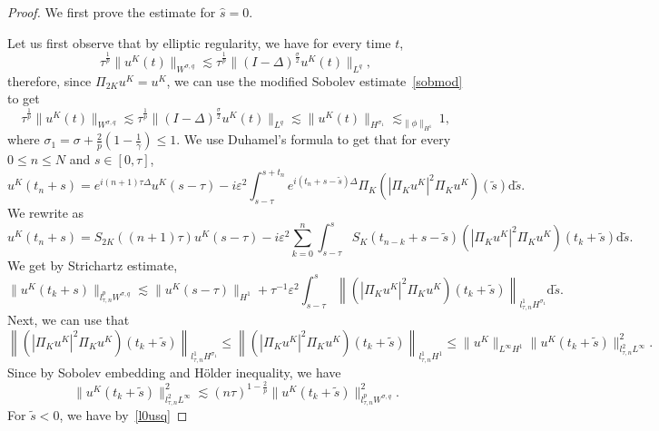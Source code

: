\documentclass[10pt,a4paper]{article}
\begin{document}
  \begin{proof}
    We first prove the estimate for \(\hat{s}=0\).

    Let us first observe that by elliptic regularity, we have for every time
    \(t\),
    \[ \tau^{\frac{1}{p}} \|u^K(t)\|_{W^{\sigma,q}} \lesssim \tau^{\frac{1}{p}}
    \|(I-\Delta)^{\frac{\sigma}{2}} u^K(t)\|_{L^q}, \]
    therefore, since \(\Pi_{2K}u^K=u^K\), we can use the modified Sobolev
    estimate~\eqref{sobmod} to get 
    \begin{equation}\label{l0usq}%
      \tau^{\frac{1}{p}} \|u^K(t)\|_{W^{\sigma, q}} \lesssim 
      \tau^{\frac{1}{p}} \|(I-\Delta)^{\frac{\sigma}{2}} u^K(t)\|_{L^q} 
      \lesssim \|u^K(t)\|_{H^{\sigma_1}} 
      \lesssim_{\|\phi\|_{H^1}} 1,
    \end{equation}
    where \(\sigma_1 = \sigma + \frac2p(1-\frac1\gamma) \leq 1\).
    We use Duhamel's formula to get that for every \( 0 \leq n \leq N \) and 
    \( s \in [0,\tau] \),
    \[ u^K(t_n+s) = e^{i(n+1)\tau\Delta} u^K(s-\tau) - i\varepsilon^2 
    \int_{s-\tau}^{s+t_n} e^{i(t_n+s-\tilde{s})\Delta}\Pi_K
    \left(|\Pi_K u^K|^2 \Pi_K u^K\right) (\tilde{s}) \mathrm{d} \tilde{s}. \]
    We rewrite as 
    \begin{equation}\label{disc-str-est-duham}
      u^K(t_n+s) = S_{2K}((n+1)\tau) u^K(s-\tau) - i\varepsilon^2 
      \sum_{k=0}^n \int_{s-\tau}^{s} S_K(t_{n-k}+s-\tilde{s}) \left(|\Pi_K u^K|^2 \Pi_K u^K\right) (t_k+\tilde{s}) \mathrm{d} \tilde{s}.
    \end{equation}
    We get by Strichartz estimate, %
    \begin{equation}
      \|u^K(t_k+s)\|_{l^p_{\tau,n}W^{\sigma,q}} \lesssim \|u^K(s-\tau)\|_{H^1} + \tau^{-1}
      \varepsilon^2 \int_{s-\tau}^s \left\|\left(|\Pi_K u^K|^2 \Pi_K u^K\right) 
      (t_k+\tilde{s})\right\|_{l^1_{\tau,n}H^{\sigma_1}} \mathrm{d} \tilde{s}.
    \end{equation}
    Next, we can use that 
    \[ \left\|\left(|\Pi_K u^K|^2 \Pi_K u^K\right) (t_k+\tilde{s})\right\|_{l^1_{\tau,n}H^{\sigma_1}}
    \leq \left\|\left(|\Pi_K u^K|^2 \Pi_K u^K\right) (t_k+\tilde{s})\right\|_{l^1_{\tau,n}H^1}
    \leq \|u^K\|_{L^{\infty}H^1}\|u^K(t_k+\tilde{s})\|_{l^2_{\tau,n}L^{\infty}}^2. \]
    Since by Sobolev embedding and H\"older inequality, we have 
    \[ \|u^K(t_k+\tilde{s})\|_{l^2_{\tau,n}L^{\infty}}^2 \lesssim
    (n\tau)^{1-\frac{2}{p}}\|u^K(t_k+\tilde{s})\|_{l^p_{\tau,n}W^{\sigma,q}}^2.\]
    For \( \tilde{s} < 0 \), we have by~\eqref{l0usq}

\end{proof}
\end{document}
